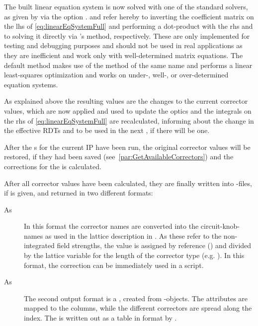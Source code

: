 \label{par:SolveEquationSystem}

The built linear equation system is now solved with one of the standard solvers, as given by via the option .
 and  refer hereby to inverting the coefficient matrix on the lhs of \cref{eq:linearEqSystemFull} 
and performing a dot-product with the rhs and to solving it directly via 's  method, respectively.
These are only implemented for testing and debugging purposes and should not be used in real applications as they are inefficient
and work only with well-determined matrix equations.
The default method  makes use of the  method of the same name and performs a linear least-squares optimization
and works on under-, well-, or over-determined equation systems.

As explained above the resulting values are the changes to the current corrector values, 
which are now applied and used to update the optics and the integrals on the rhs of \cref{eq:linearEqSystemFull} are
recalculated, informing about the change in the effective RDTs and to be used in the next , if there will be one. 

After the s for the current IP have been run,
the original corrector values will be restored, if they had been saved (see~\cref{par:GetAvailableCorrectors}) 
and the corrections for the  is calculated.


\label{par:Output}
After all corrector values have been calculated, they are finally written into -files, if  is given, and returned 
in two different formats:
\begin{description}
  \item[As ] In this format the corrector names are converted into the circuit-knob-names as used in the lattice description in .
                        As these refer to the non-integrated field strengths, the value is assigned by reference (\ttt{:=}) and divided by 
                        the lattice variable for the length of the corrector type (e.g. ).
                        In this format, the correction can be immediately used in a  script.    
  \item[As ] The second output format is a , created from -objects. 
                        The attributes are mapped to the columns, while the different correctors are spread along the index.
                        The  is written out as a table in  format by .
\end{description}


